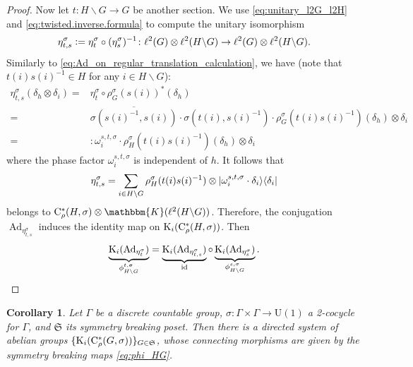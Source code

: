\documentclass{amsart}
\numberwithin{figure}{section}
\numberwithin{equation}{section}
\numberwithin{table}{section}
\theoremstyle{plain}
\newtheorem{corollary}[equation]{Corollary}
\theoremstyle{definition}
\theoremstyle{remark}
\theoremstyle{nonumber}
\newcommand{\Cpt}{\mathbb{K}}
\newcommand{\K}{\relax\ifmmode\operatorname{K}\else\textup{K}\fi}
\newcommand{\Cst}{\relax\ifmmode\mathrm{C}^*\else\textup{C*}\fi}
\newcommand{\Cstr}{\Cst_\rho} %
\newcommand{\Ad}{\operatorname{Ad}} %
\newcommand{\id}{\operatorname{id}} %
\newcommand{\defeq}{\mathrel{\vcentcolon=}}
\renewcommand{\mathbb}{\mathbbm} %
\DeclarePairedDelimiter{\ket}{\lvert}{\rangle} %
\DeclarePairedDelimiter{\bra}{\langle}{\rvert} %
\begin{document}
\begin{proof}
Now let \( t\colon H\backslash G\to G \) be another section. We
use \eqref{eq:unitary_l2G_l2H} and \eqref{eq:twisted.inverse.formula} to
compute the unitary isomorphism
\[ 
  \eta_{t,s}^{\sigma}\defeq \eta_{t}^\sigma\circ(\eta_{s}^\sigma)^{-1}\colon
  \ell^2(G)\otimes\ell^2(H\backslash
  G)\to\ell^2(G)\otimes\ell^2(H\backslash G).
\]
Similarly to \eqref{eq:Ad_on_regular_translation_calculation}, we have
  (note that \(
t(i)s(i)^{-1}\in H \) for any \( i\in H\backslash G \)):
\begin{align*}
\eta_{t,s}^{\sigma}(\delta_h\otimes\delta_i)
=&\eta_{t}^{\sigma}\circ\rho_G^\sigma(s(i))^*(\delta_h) \\
=&\overline{\sigma(s(i)^{-1},s(i))}\cdot\sigma(t(i),s(i)^{-1})
\cdot\rho_G^\sigma(t(i)s(i)^{-1})(\delta_h)\otimes \delta_i\\
=&\colon\omega_i^{s,t,\sigma}\cdot\rho_H^\sigma(t(i)s(i)^{-1})(\delta_h)\otimes\delta_i
\end{align*}
where the phase factor \( \omega_{i}^{s,t,\sigma} \) is independent of \(
h \). It follows that
\[ 
  \eta^{\sigma}_{t,s}=\sum_{i\in H\backslash G}
  \rho_H^\sigma(t(i)s(i)^{-1})\otimes\ket{\omega_{i}^{s,t,\sigma}\cdot\delta_i}\bra{\delta_i}
\]
belongs to $\Cstr(H,\sigma)\otimes
\Cpt(\ell^2(H\backslash G))$.
Therefore, the conjugation \( \Ad_{\eta^{\sigma}_{t,s}} \) induces the identity map on
\( \K_i(\Cstr(H,\sigma)) \). Then
\[ 
  \underbrace{\K_i(\Ad_{\eta_{t}^\sigma})}_{\phi^{t,\sigma}_{H\backslash G}}=
  \underbrace{\K_i(\Ad_{\eta^{\sigma}_{t,s}})}_{\id}\circ
  \underbrace{\K_i(\Ad_{\eta_{s}^\sigma})}_{\phi^{s,\sigma}_{H\backslash
G}}.\qedhere
\]
\end{proof}

\begin{corollary}\label{cor:exists.equivalent.directed.system}
Let \( \Gamma \) be a discrete countable group, \( \sigma\colon
\Gamma\times\Gamma\to\mathrm{U}(1) \) a
2-cocycle for \( \Gamma \), and \( \mathfrak{S} \) its symmetry breaking
poset. Then there is a directed system of abelian groups \(
\{\K_i(\Cstr(G,\sigma))\}_{G\in\mathfrak{S}} \), whose connecting
morphisms are given by the symmetry breaking maps \eqref{eq:phi_HG}.
\end{corollary}
\end{document}
